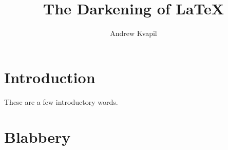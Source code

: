 \documentclass[a4paper]{article}
\title{The Darkening of \LaTeX}
\author{Andrew Kvapil}
\begin{document}
\maketitle

\section{Introduction}
These are a few introductory words.

\lipsum[1]

\section{Blabbery}
\lipsum
\end{document}
